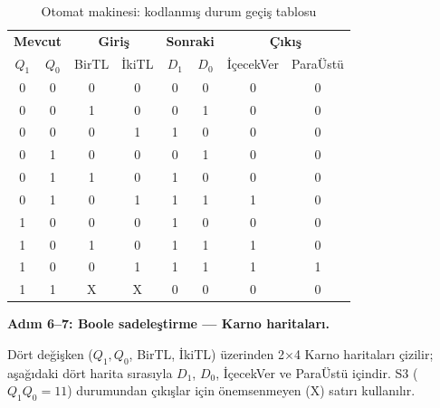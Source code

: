 \begin{ornek}[B.16]
\begin{table}[H]
\centering
\caption*{Otomat makinesi: kodlanmış durum geçiş tablosu}
\small
\begin{tabular}{cc|cc|cc|cc}
\toprule
\multicolumn{2}{c|}{\textbf{Mevcut}} &
\multicolumn{2}{c|}{\textbf{Giriş}} &
\multicolumn{2}{c|}{\textbf{Sonraki}} &
\multicolumn{2}{c}{\textbf{Çıkış}} \\
$Q_1$ & $Q_0$ & BirTL & İkiTL & $D_1$ & $D_0$ & İçecekVer & ParaÜstü \\
\midrule
0 & 0 & 0 & 0 & 0 & 0 & 0 & 0 \\
0 & 0 & 1 & 0 & 0 & 1 & 0 & 0 \\
0 & 0 & 0 & 1 & 1 & 0 & 0 & 0 \\
0 & 1 & 0 & 0 & 0 & 1 & 0 & 0 \\
0 & 1 & 1 & 0 & 1 & 0 & 0 & 0 \\
0 & 1 & 0 & 1 & 1 & 1 & 1 & 0 \\
1 & 0 & 0 & 0 & 1 & 0 & 0 & 0 \\
1 & 0 & 1 & 0 & 1 & 1 & 1 & 0 \\
1 & 0 & 0 & 1 & 1 & 1 & 1 & 1 \\
1 & 1 & X & X & 0 & 0 & 0 & 0 \\
\bottomrule
\end{tabular}
\end{table}

\textbf{Adım 6--7: Boole sadeleştirme — Karno haritaları.}

Dört değişken ($Q_1, Q_0$, BirTL, İkiTL) üzerinden 2$\times$4 Karno haritaları çizilir; aşağıdaki dört harita sırasıyla $D_1$, $D_0$, İçecekVer ve ParaÜstü içindir. S3 ($Q_1 Q_0 = 11$) durumundan çıkışlar için önemsenmeyen (X) satırı kullanılır.

\newcommand{\otomatkarno}[5]{%
\begin{tikzpicture}[scale=0.6]
    \draw[thick] (0,0) grid (4,4);
    \node[above left, font=\footnotesize] at (0, 4) {$Q_1Q_0$\textbackslash\,BirTL\,İkiTL};
    \node[above, font=\footnotesize] at (0.5, 4) {00};
    \node[above, font=\footnotesize] at (1.5, 4) {01};
    \node[above, font=\footnotesize] at (2.5, 4) {11};
    \node[above, font=\footnotesize] at (3.5, 4) {10};
    \node[left, font=\footnotesize] at (0, 3.5) {00};
    \node[left, font=\footnotesize] at (0, 2.5) {01};
    \node[left, font=\footnotesize] at (0, 1.5) {11};
    \node[left, font=\footnotesize] at (0, 0.5) {10};
    #1 #2 #3 #4 #5
\end{tikzpicture}%
}


\end{ornek}
